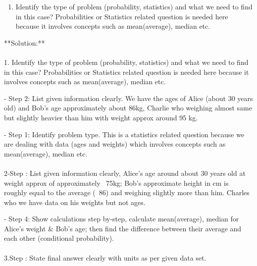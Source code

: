 \documentclass[12pt]{article}
\begin{document}
\begin{enumerate}
    \item Identify the type of problem (probability, statistics) and what we need to find in this case? Probabilities or Statistics related question is needed here because it involves concepts such as mean(average), median etc. 
    
   \end{enumerate}\newline\begin {center}   
      **Solution:**\\ \\
      1. Identify the type of problem (probability, statistics) and what we need to find in this case? Probabilities or Statistics related question is needed here because it involves concepts such as mean(average), median etc.\\  \newline\begin {enumerate}  
    - Step 2: List given information clearly. We have the ages of Alice (about 30 years old) and Bob's age approximately about 86kg, Charlie who weighing almost same but slightly heavier than him with weight approx around 95 kg.\\ \newline\begin {enumerate}
    - Step 1: Identify problem type. This is a statistics related question because we are dealing with data (ages and weights) which involves concepts such as mean(average), median etc.\\\ \\  
    2-Step : List given information clearly, Alice's age around about 30 years old at weight approx of approximately ~75kg; Bob’s approximate height in cm is roughly equal to the average (~86) and weighing slightly more than him. Charles who we have data on his weights but not ages.\\ \newline\begin {enumerate}
    - Step 4: Show calculations step by-step, calculate mean(average), median for Alice's weight & Bob’s age; then find the difference between their average and each other (conditional probability).\\ \\  3.Step : State final answer clearly with units as per given data set.\\ \newline\begin {enumerate}

\end{enumerate}
\end{enumerate}
\end{enumerate}
\end{enumerate}
\end{center}
\end{document}
